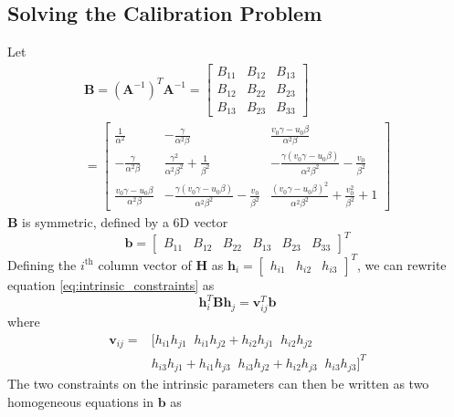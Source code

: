 \subsection{Solving the Calibration Problem}
Let
\begin{multline}
    \mathbf{B}=(\mathbf{A}^{-1})^T\mathbf{A}^{-1}=\begin{bmatrix}B_{11} & B_{12} & B_{13} \\ B_{12} & B_{22} & B_{23} \\ B_{13} & B_{23} & B_{33}\end{bmatrix}\\
    =\begin{bmatrix}\frac{1}{\alpha^2} & -\frac{\gamma}{\alpha^2\beta} & \frac{v_0\gamma-u_0\beta}{\alpha^2\beta}\\
    -\frac{\gamma}{\alpha^2\beta} & \frac{\gamma^2}{\alpha^2\beta^2}+\frac{1}{\beta^2} & -\frac{\gamma(v_0\gamma-u_0\beta)}{\alpha^2\beta^2}-\frac{v_0}{\beta^2} \\
    \frac{v_0\gamma-u_0\beta}{\alpha^2\beta} & -\frac{\gamma(v_0\gamma-u_0\beta)}{\alpha^2\beta^2}-\frac{v_0}{\beta^2} & \frac{(v_0\gamma-u_0\beta)^2}{\alpha^2\beta^2}+\frac{v_0^2}{\beta^2}+1\end{bmatrix}
\end{multline}
$\mathbf{B}$ is symmetric, defined by a 6D vector
\begin{equation}
    \mathbf{b}=\begin{bmatrix}B_{11} & B_{12} & B_{22} & B_{13} & B_{23} & B_{33} \end{bmatrix}^T
\end{equation}
Defining the $i^{\text{th}}$ column vector of $\mathbf{H}$ as $\mathbf{h}_i=\begin{bmatrix}h_{i1} & h_{i2} & h_{i3}\end{bmatrix}^T$, we can rewrite equation \ref{eq:intrinsic_constraints} as
\begin{equation}
    \mathbf{h}_i^T\mathbf{B}\mathbf{h}_j=\mathbf{v}_{ij}^T\mathbf{b}
\end{equation}
where
\begin{equation}
\begin{split}
    \mathbf{v}_{ij}=&[h_{i1}h_{j1} \;\; h_{i1}h_{j2}+h_{i2}h_{j1} \;\; h_{i2}h_{j2} \\
     & h_{i3}h_{j1}+h_{i1}h_{j3} \;\; h_{i3}h_{j2}+h_{i2}h_{j3} \;\; h_{i3}h_{j3}]^T
\end{split}
\end{equation}
The two constraints on the intrinsic parameters can then be written as two homogeneous equations in $\mathbf{b}$ as
